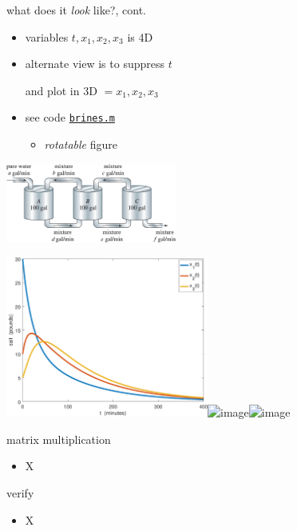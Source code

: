 \documentclass[urlcolor=blue,dvipsnames]{beamer}
\begin{document}
\begin{frame}{what does it \emph{look} like?, cont.}

\begin{itemize}
\item variables $t,x_1,x_2,x_3$ is 4D
\item alternate view is to suppress $t$

and plot in 3D $=x_1,x_2,x_3$
\item see code \href{https://bueler.github.io/math302/assets/codes/brines.m}{\texttt{brines.m}}
    \begin{itemize}
    \item<2> \emph{rotatable} figure
    \end{itemize}
\end{itemize}

\vspace{-21mm}
\hfill \includegraphics[width=0.42\textwidth]{figs/three-tanks}

\mbox{\includegraphics[width=0.5\textwidth]{figs/brines-xvt}\quad \includegraphics<1>[width=0.5\textwidth]{figs/brines-3d}\includegraphics<2>[width=0.5\textwidth]{figs/brines-3d-again}}
\end{frame}


\begin{frame}{matrix multiplication}

\begin{itemize}
\item X
\end{itemize}
\end{frame}


\begin{frame}{verify}

\begin{itemize}
\item X
\end{itemize}
\end{frame}
\end{document}
